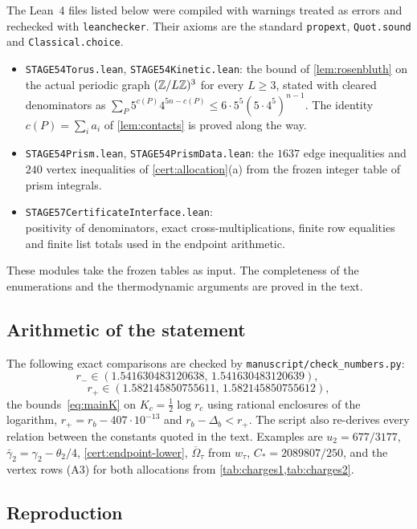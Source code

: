 The Lean~4 files listed below were compiled with warnings treated as errors and rechecked with \texttt{leanchecker}. Their axioms are the standard \texttt{propext}, \texttt{Quot.sound} and \texttt{Classical.choice}.
\begin{itemize}
\item \nolinkurl{STAGE54Torus.lean}, \nolinkurl{STAGE54Kinetic.lean}: the bound of \cref{lem:rosenbluth} on the actual periodic graph $(\mathbb Z/L\mathbb Z)^3$ for every $L\ge3$, stated with cleared denominators as $\sum_P5^{c(P)}4^{5n-c(P)}\le6\cdot5^5(5\cdot4^5)^{n-1}$. The identity $c(P)=\sum_ia_i$ of \cref{lem:contacts} is proved along the way.
\item \nolinkurl{STAGE54Prism.lean}, \nolinkurl{STAGE54PrismData.lean}: the $1637$ edge inequalities and $240$ vertex inequalities of \cref{cert:allocation}(a) from the frozen integer table of prism integrals.
\item \nolinkurl{STAGE57CertificateInterface.lean}:\\ positivity of denominators, exact cross-multiplications, finite row equalities and finite list totals used in the endpoint arithmetic.
\end{itemize}
These modules take the frozen tables as input. The completeness of the enumerations and the thermodynamic arguments are proved in the text.

\subsection{Arithmetic of the statement}\label{app:arith}

The following exact comparisons are checked by \nolinkurl{manuscript/check_numbers.py}:
\[
 r_-\in(1.541630483120638,\,1.541630483120639),\qquad
\]
\[
 r_+\in(1.582145850755611,\,1.582145850755612),
\] the bounds~\eqref{eq:mainK} on $K_c=\frac12\log r_c$ using rational enclosures of the logarithm, $r_+=r_b-407\cdot10^{-13}$ and $r_b-\Delta_b<r_+$. The script also re-derives every relation between the constants quoted in the text. Examples are $u_2=677/3177$, $\bar\gamma_2=\gamma_2-\theta_2/4$, \cref{cert:endpoint-lower}, $\overline\Omega_\tau$ from $w_\tau$, $C_*=2089807/250$, and the vertex rows (A3) for both allocations from \cref{tab:charges1,tab:charges2}.

\subsection{Reproduction}

